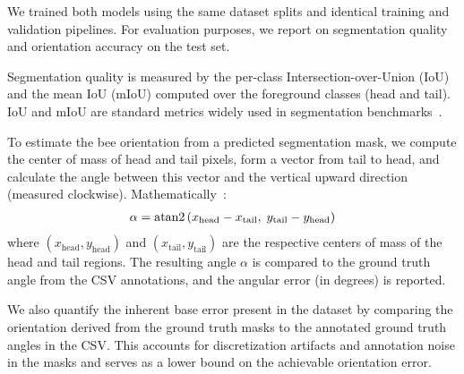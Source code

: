 We trained both models using the same dataset splits and identical training and validation pipelines.
For evaluation purposes, we report on segmentation quality and orientation accuracy on the test set.

Segmentation quality is measured by the per-class Intersection-over-Union (IoU) and the mean IoU (mIoU) computed over the foreground classes (head and tail).
IoU and mIoU are standard metrics widely used in segmentation benchmarks~\cite{lin2014microsoft, kirillov2023segment, jha2020doubleu, ronneberger2015u}.

To estimate the bee orientation from a predicted segmentation mask, we compute the center of mass of head and tail pixels, form a vector from tail to head, and calculate the angle between this vector and the vertical upward direction (measured clockwise). Mathematically~\cite{noauthor_nodate_math}:
\begin{align*}
    \alpha = \operatorname{atan2}\left( x_{\text{head}} - x_{\text{tail}}, \; y_{\text{tail}} - y_{\text{head}} \right)
\end{align*}
where \((x_{\text{head}}, y_{\text{head}})\) and \((x_{\text{tail}}, y_{\text{tail}})\) are the respective centers of mass of the head and tail regions.
The resulting angle $\alpha$ is compared to the ground truth angle from the CSV annotations, and the angular error (in degrees) is reported.

We also quantify the inherent base error present in the dataset by comparing the orientation derived from the ground truth masks to the annotated ground truth angles in the CSV.
This accounts for discretization artifacts and annotation noise in the masks and serves as a lower bound on the achievable orientation error.